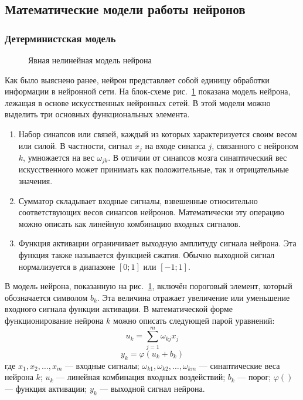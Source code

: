 \subsection{Математические модели работы нейронов}
\subsubsection{Детерминистская модель}
\begin{figure}[h]
\caption{Явная нелинейная модель нейрона}
\label{ris:BlockScheme}
\end{figure}
Как было выяснено ранее, нейрон представляет собой единицу обработки информации в нейронной сети. 
На блок-схеме рис.~\ref{ris:BlockScheme} показана модель нейрона, лежащая в основе искусственных нейронных сетей.
В этой модели можно выделить три основных функциональных элемента.
\begin{enumerate}
\item Набор синапсов или связей, каждый из которых характеризуется своим весом или силой.
В частности, сигнал $x_j$ на входе синапса $j$, связанного с нейроном $k$, умножается на вес $\omega_{jk}$.
В отличии от синапсов мозга синаптический вес искусственного может принимать как положительные, так и отрицательные значения. 
\item Сумматор складывает входные сигналы, взвешенные относительно соответствующих весов синапсов нейронов.
Математически эту операцию можно описать как линейную комбинацию входных сигналов.
\item Функция активации ограничивает выходную амплитуду сигнала нейрона.
Эта функция также называется функцией сжатия.
Обычно выходной сигнал нормализуется в диапазоне $[0;1]$ или $[-1;1]$.
\end{enumerate}
В модель нейрона, показанную на рис.~\ref{ris:BlockScheme}, включён пороговый элемент, который обозначается символом $b_k$.
Эта величина отражает увеличение или уменьшение входного сигнала функции активации.
В математической форме функционирование нейрона $k$ можно описать следующей парой уравнений:
\begin{equation}
u_k = \sum_{j=1}^{m} \omega_{kj}x_j
\end{equation}
\begin{equation}
y_k = \varphi (u_k + b_k)
\end{equation}
где $x_1,x_2,\dots,x_m$ --- входные сигналы;
$\omega_{k1},\omega_{k2},\dots,\omega_{km}$ --- синаптические веса нейрона $k$;
$u_k$ --- линейная комбинация входных воздействий;
$b_k$ --- порог;
$\varphi()$ --- функция активации;
$y_k$ --- выходной сигнал нейрона.\cite{NejronnyeSeti}
